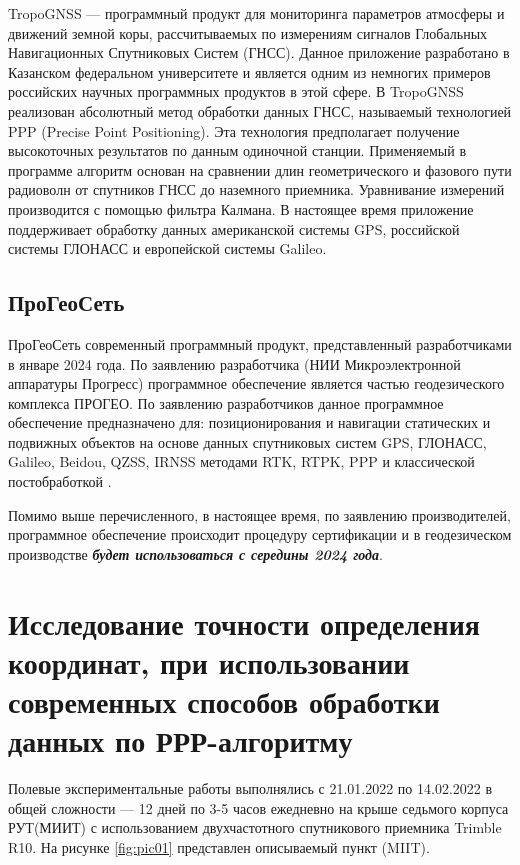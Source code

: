 TropoGNSS --- программный продукт для мониторинга параметров атмосферы и движений земной коры, рассчитываемых по измерениям сигналов Глобальных Навигационных Спутниковых Систем (ГНСС). Данное приложение разработано в Казанском федеральном университете и является одним из немногих примеров российских научных программных продуктов в этой сфере. В TropoGNSS реализован абсолютный метод обработки данных ГНСС, называемый технологией PPP (Precise Point Positioning). Эта технология предполагает получение высокоточных результатов по данным одиночной станции. Применяемый в программе алгоритм основан на сравнении длин геометрического и фазового пути радиоволн от спутников ГНСС до наземного приемника. Уравнивание измерений производится с помощью фильтра Калмана. В настоящее время приложение поддерживает обработку данных американской системы GPS, российской системы ГЛОНАСС и европейской системы Galileo.

\subsection{ПроГеоСеть}\label{subsec:ch2/sec2/sub8}

ПроГеоСеть современный программный продукт, представленный разработчиками в январе 2024 года. По заявлению разработчика (НИИ Микроэлектронной аппаратуры Прогресс) программное обеспечение является частью геодезического комплекса ПРОГЕО. По заявлению разработчиков данное программное обеспечение предназначено для: позиционирования и навигации статических и подвижных объектов на основе данных спутниковых систем GPS, ГЛОНАСС, Galileo, Beidou, QZSS, IRNSS методами RTK, RTPK, PPP и классической постобработкой \cite{src36}.

Помимо выше перечисленного, в настоящее время, по заявлению производителей, программное обеспечение происходит процедуру сертификации и в геодезическом производстве \textbf{\textit{будет использоваться с середины 2024 года}}.


\section{Исследование точности определения координат, при использовании современных способов обработки данных по РРР-алгоритму}\label{sec:ch2/sec3}

Полевые экспериментальные работы выполнялись с 21.01.2022 по 14.02.2022 в общей сложности --- 12 дней по 3-5 часов ежедневно на крыше седьмого корпуса РУТ(МИИТ) с использованием двухчастотного спутникового приемника Trimble R10. На рисунке \cref{fig:pic01} представлен описываемый пункт (MIIT).

